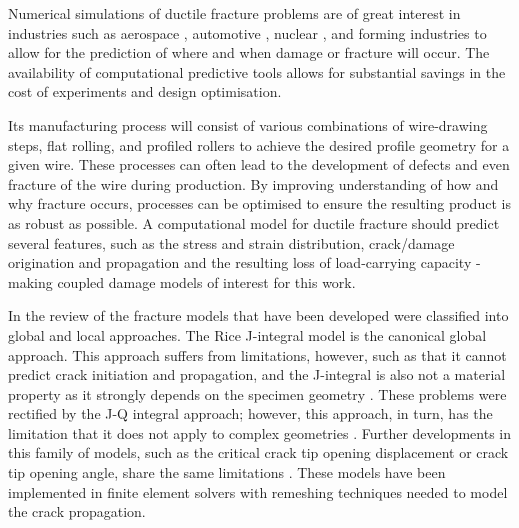\documentclass[sn-mathphys,Numbered,draft]{sn-jnl}%
\begin{document}
Numerical simulations of ductile fracture problems are of great interest in industries such as aerospace \cite{riccio_damage_2015, johnson_numerical_2015}, automotive \cite{alharbi_damage_2015, sirinakorn_microstructure_2014, sarraf_mesoscale_2017, uthaisangsuk_characterisation_2009}, nuclear \cite{chen_modeling_2020}, and forming industries \cite{masse_study_2010, cao_models_2017, tekkaya_damage_2020, clancy_improving_2019, borchers_cold-drawn_2016, cardiff_lagrangian_2017} to allow for the prediction of where and when damage or fracture will occur.
The availability of computational predictive tools allows for substantial savings in the cost of experiments and design optimisation.

Its manufacturing process will consist of various combinations of wire-drawing steps, flat rolling, and profiled rollers to achieve the desired profile geometry for a given wire.
These processes can often lead to the development of defects and even fracture of the wire during production. By improving understanding of how and why fracture occurs, processes can be optimised to ensure the resulting product is as robust as possible.
A computational model for ductile fracture should predict several features, such as the stress and strain distribution, crack/damage origination and propagation and the resulting loss of load-carrying capacity - making coupled damage models of interest for this work.

In the review of \citet{besson_continuum_2010} the fracture models that have been developed were classified into global and local approaches. The Rice J-integral model is the canonical global approach. This approach suffers from limitations, however, such as that it cannot predict crack initiation and propagation, and the J-integral is also not a material property as it strongly depends on the specimen geometry \cite{hackett_experimental_1993}. These problems were rectified by the J-Q integral approach; however, this approach, in turn, has the limitation that it does not apply to complex geometries \cite{odowd_family_1991}. Further developments in this family of models, such as the critical crack tip opening displacement or crack tip opening angle, share the same limitations \cite{james_effect_2003,mahmoud_effect_2003}. These models have been implemented in finite element solvers with remeshing techniques needed to model the crack propagation.
\end{document}
